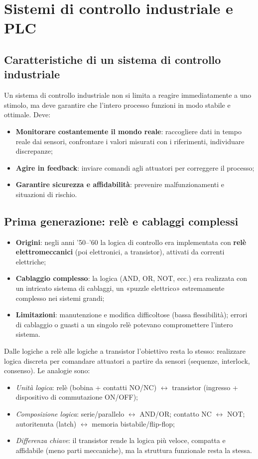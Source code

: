 \section{Sistemi di controllo industriale e PLC}
\subsection{Caratteristiche di un sistema di controllo industriale}
Un sistema di controllo industriale non si limita a reagire immediatamente a uno stimolo, ma deve garantire che l'intero processo funzioni in modo stabile e ottimale. Deve:
\begin{itemize}
    \item \textbf{Monitorare costantemente il mondo reale}: raccogliere dati in tempo reale dai sensori, confrontare i valori misurati con i riferimenti, individuare discrepanze;
    \item \textbf{Agire in feedback}: inviare comandi agli attuatori per correggere il processo;
    \item \textbf{Garantire sicurezza e affidabilità}: prevenire malfunzionamenti e situazioni di rischio.
\end{itemize}

\subsection{Prima generazione: relè e cablaggi complessi}
\begin{itemize}
    \item \textbf{Origini}: negli anni '50--'60 la logica di controllo era implementata con \textbf{relè elettromeccanici} (poi elettronici, a transistor), attivati da correnti elettriche;
    \item \textbf{Cablaggio complesso}: la logica (AND, OR, NOT, ecc.) era realizzata con un intricato sistema di cablaggi, un «puzzle elettrico» estremamente complesso nei sistemi grandi;
    \item \textbf{Limitazioni}: manutenzione e modifica difficoltose (bassa flessibilità); errori di cablaggio o guasti a un singolo relè potevano compromettere l'intero sistema.
\end{itemize}

Dalle logiche a relè alle logiche a transistor l'obiettivo resta lo stesso: realizzare logica discreta per comandare attuatori a partire da sensori (sequenze, interlock, consenso). Le analogie sono:
\begin{itemize}
    \item \emph{Unità logica}: relè (bobina + contatti NO/NC) $\leftrightarrow$ transistor (ingresso + dispositivo di commutazione ON/OFF);
    \item \emph{Composizione logica}: serie/parallelo $\leftrightarrow$ AND/OR; contatto NC $\leftrightarrow$ NOT; autoritenuta (latch) $\leftrightarrow$ memoria bistabile/flip-flop;
    \item \emph{Differenza chiave}: il transistor rende la logica più veloce, compatta e affidabile (meno parti meccaniche), ma la struttura funzionale resta la stessa.
\end{itemize}

